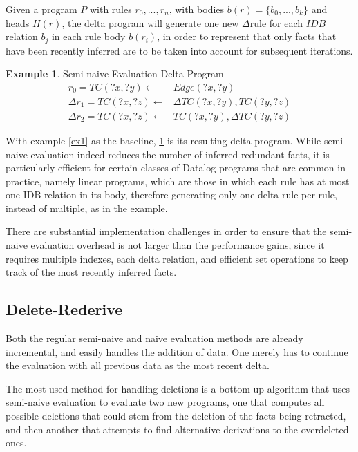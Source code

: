 \documentclass[sigconf,screen,review=false,natbib]{acmart}
\theoremstyle{definition}
\newtheorem{exmp}{Example}[section]
\begin{document}
Given a program $P$ with rules $r_0, ..., r_n$, with bodies $b(r) = \{b_0, ..., b_k\}$ and heads $H(r)$, the delta program
will generate one new $\Delta$rule for each $IDB$ relation $b_j$ in each rule body $b(r_i)$, in order to represent that only
facts that have been recently inferred are to be taken into account for subsequent iterations.
\begin{exmp}{Semi-naive Evaluation Delta Program}
	\begin{align*}
		r_0 = TC(?x, ?y) \leftarrow        & Edge(?x, ?y)                  \\
		\Delta r_1 = TC(?x, ?z) \leftarrow & \Delta TC(?x, ?y), TC(?y, ?z) \\
		\Delta r_2 = TC(?x, ?z) \leftarrow & TC(?x, ?y), \Delta TC(?y, ?z)
	\end{align*}
	\label{exsne}
\end{exmp}
With example \ref{ex1} as the baseline, \ref{exsne} is its resulting delta program. While semi-naive evaluation indeed reduces
the number of inferred redundant facts, it is particularly efficient for certain classes of Datalog programs that are common
in practice, namely linear programs, which are those in which each rule has at most one IDB relation in its body, therefore
generating only one delta rule per rule, instead of multiple, as in the example.

There are substantial implementation challenges in order to ensure that the semi-naive evaluation overhead is not larger than
the performance gains, since it requires multiple indexes, each delta relation, and efficient set operations to keep track of
the most recently inferred facts.
\subsection{Delete-Rederive}
Both the regular semi-naive and naive evaluation methods are already incremental, and easily handles the
addition of data. One merely has to continue the evaluation with all previous data as the most recent delta.

The most used method for handling deletions is a bottom-up algorithm\cite{dred} that uses semi-naive evaluation
to evaluate two new programs, one that computes all possible deletions that could stem from the deletion of the
facts being retracted, and then another that attempts to find alternative derivations to the overdeleted ones.
\end{document}
